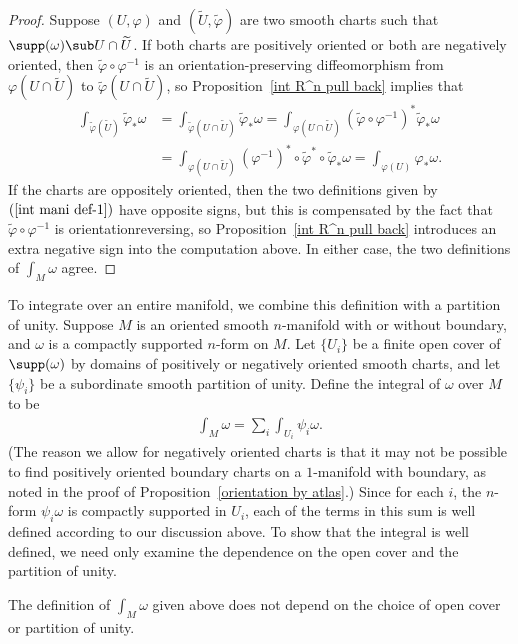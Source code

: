 \begin{proof}
Suppose $(U,\varphi)$ and $(\widetilde{U},\widetilde{\varphi})$ are two smooth charts such that $\supp(\omega)\sub U\cap\widetilde{U}$. If both charts are positively oriented or both are negatively oriented, then $\widetilde{\varphi}\circ\varphi^{-1}$ is an orientation-preserving diffeomorphism from $\varphi(U\cap\widetilde{U})$ to $\widetilde{\varphi}(U\cap\widetilde{U})$, so Proposition~\ref{int R^n pull back} implies that
\begin{align*}
\int_{\widetilde{\varphi}(\widetilde{U})}\widetilde{\varphi}_*\omega&=\int_{\widetilde{\varphi}(U\cap\widetilde{U})}\widetilde{\varphi}_*\omega=\int_{\varphi(U\cap\widetilde{U})}(\widetilde{\varphi}\circ\varphi^{-1})^*\widetilde{\varphi}_*\omega\\
&=\int_{\varphi(U\cap\widetilde{U})}(\varphi^{-1})^*\circ\widetilde{\varphi}^*\circ\widetilde{\varphi}_*\omega=\int_{\varphi(U)}\varphi_*\omega.
\end{align*}
If the charts are oppositely oriented, then the two definitions given by $(\ref{int mani def-1})$ have opposite signs, but this is compensated by the fact that $\widetilde{\varphi}\circ\varphi^{-1}$ is orientationreversing, so Proposition~\ref{int R^n pull back} introduces an extra negative sign into the computation above. In either case, the two definitions of $\int_M\omega$ agree.
\end{proof}
To integrate over an entire manifold, we combine this definition with a partition of unity. Suppose $M$ is an oriented smooth $n$-manifold with or without boundary, and $\omega$ is a compactly supported $n$-form on $M$. Let $\{U_i\}$ be a finite open cover of $\supp(\omega)$ by domains of positively or negatively oriented smooth charts, and let $\{\psi_i\}$ be a subordinate smooth partition of unity. Define the integral of $\omega$ over $M$ to be
\begin{align}\label{int mani def-2}
\int_M\omega=\sum_i\int_{U_i}\psi_i\omega.
\end{align}
(The reason we allow for negatively oriented charts is that it may not be possible to find positively oriented boundary charts on a $1$-manifold with boundary, as noted in the proof of Proposition~\ref{orientation by atlas}.) Since for each $i$, the $n$-form $\psi_i\omega$ is compactly supported in $U_i$, each of the terms in this sum is well defined according to our discussion above. To show that the integral is well defined, we need only examine the dependence on the open cover and the partition of unity.
\begin{proposition}
The definition of $\int_M\omega$ given above does not depend on the choice of open cover or partition of unity.
\end{proposition}
